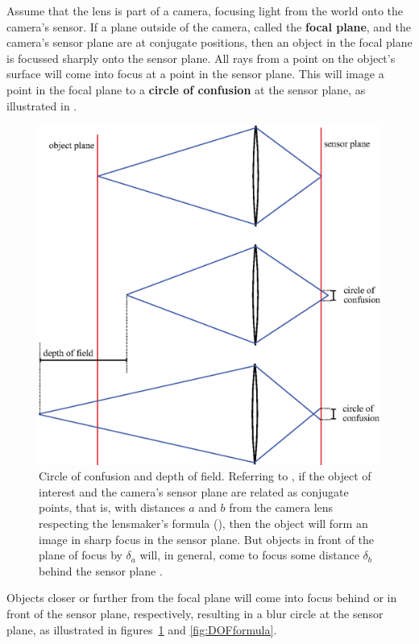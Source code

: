 Assume that the lens is part of a camera, focusing light from the world onto the camera's sensor.  If a plane outside of the camera, called the {\bf focal plane}, and the camera's sensor plane are at conjugate positions, then an object in the focal plane is focussed sharply onto the sensor plane.  All rays from a point on the object's surface will come into focus at a point in the sensor plane.  This will image a point in the focal plane to a {\bf circle of confusion} at the sensor plane, as illustrated in \fig{\ref{fig:circleOfConfusion}}.


\begin{figure}
\centerline{
\includegraphics[width=0.7\linewidth]{figures/imaging/circleOfConfusion.eps}}
\caption{Circle of confusion and depth of field.  Referring to \fig{\ref{fig:rotatedLens}}, if the object of interest and the camera's sensor plane are related as conjugate points, that is, with distances $a$ and $b$ from the camera lens respecting the lensmaker's formula (\eqn{\ref{eq:lensmaker}}), then the object will form an image in sharp focus in the sensor plane. But objects in front of the plane of focus by $\delta_a$ will, in general, come to focus some distance $\delta_b$ behind the sensor plane \cite{Levoy2010}.}
\label{fig:circleOfConfusion}
\end{figure}

Objects closer or further from the focal plane will come into focus behind or in front of the sensor plane, respectively, resulting in a blur circle at the sensor plane, as illustrated in figures~\ref{fig:circleOfConfusion} and \ref{fig:DOFformula}.


